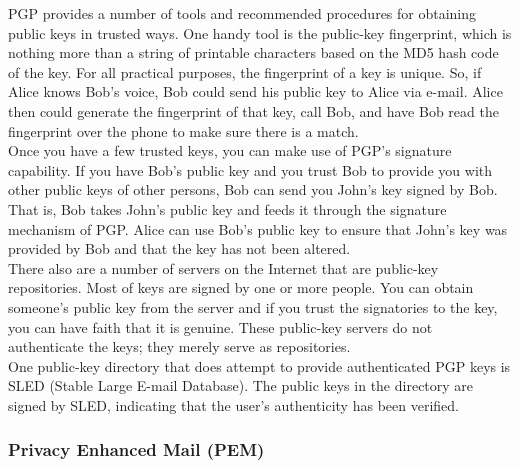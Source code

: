 \begin{htmllist}
    PGP provides a number of tools and recommended procedures for obtaining
    public keys in trusted ways. One handy tool is the public-key
    fingerprint, which is nothing more than a string of printable
    characters based on the MD5 hash code of the key. For all practical
    purposes, the fingerprint of a key is unique. So, if Alice knows Bob's
    voice, Bob could send his public key to Alice via e-mail. Alice then
    could generate the fingerprint of that key, call Bob, and have Bob read
    the fingerprint over the phone to make sure there is a match.\\
    
    Once you have a few trusted keys, you can make use of PGP's signature
    capability. If you have Bob's public key and you trust Bob to provide
    you with other public keys of other persons, Bob can send you John's
    key signed by Bob. That is, Bob takes John's public key and feeds it
    through the signature mechanism of PGP. Alice can use Bob's public key
    to ensure that John's key was provided by Bob and that the key has not
    been altered.\\
    
    There also are a number of servers on the Internet that are public-key
    repositories. Most of keys are signed by one or more people. You can
    obtain someone's public key from the server and if you trust the
    signatories to the key, you can have faith that it is genuine. These
    public-key servers do not authenticate the keys; they merely serve as
    repositories.\\
    
    One public-key directory that does attempt to provide authenticated PGP
    keys is SLED (Stable Large E-mail Database). The public keys in the
    directory are signed by SLED, indicating that the user's authenticity
    has been verified.
\end{htmllist}

\subsubsection{Privacy Enhanced Mail (PEM)}

